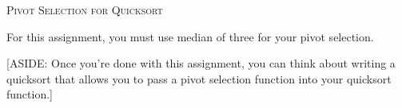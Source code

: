 \textsc{Pivot Selection for Quicksort}

For this assignment, you must use median of three for your pivot selection.

[ASIDE: Once you're done with this assignment, you can think about writing a
quicksort that allows you to pass a pivot selection function into your
quicksort function.]
